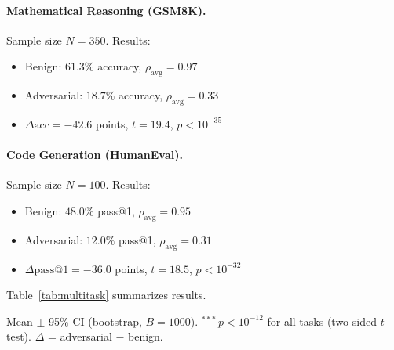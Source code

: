 \documentclass[10pt,twocolumn]{article}
\begin{document}
\paragraph{Mathematical Reasoning (GSM8K).}
Sample size $N=350$. Results:
\begin{itemize}
\item Benign: $61.3\%$ accuracy, $\rho_{\text{avg}}=0.97$
\item Adversarial: $18.7\%$ accuracy, $\rho_{\text{avg}}=0.33$
\item $\Delta\text{acc} = -42.6$ points, $t=19.4$, $p<10^{-35}$
\end{itemize}

\paragraph{Code Generation (HumanEval).}
Sample size $N=100$. Results:
\begin{itemize}
\item Benign: $48.0\%$ pass@1, $\rho_{\text{avg}}=0.95$
\item Adversarial: $12.0\%$ pass@1, $\rho_{\text{avg}}=0.31$
\item $\Delta\text{pass@1} = -36.0$ points, $t=18.5$, $p<10^{-32}$
\end{itemize}

Table~\ref{tab:multitask} summarizes results.

\begin{table}[t]
\centering
\caption{Multi-Task Impact of Spectral Collapse}
\label{tab:multitask}
\small
{}

\vspace{2pt}
\begin{minipage}{\columnwidth}
{\footnotesize Mean $\pm$ 95\% CI (bootstrap, $B{=}1000$). $^{***}$\,$p < 10^{-12}$ for all tasks (two-sided $t$-test). $\Delta$ = adversarial $-$ benign.}
\end{minipage}
\end{table}
\end{document}
